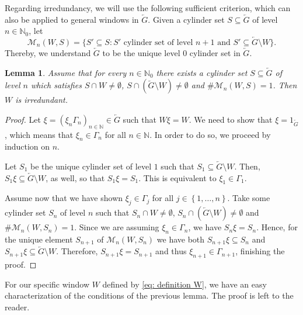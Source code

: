 \documentclass[titlepage,reqno,10pt]{amsart}
\newtheorem{lemma}[theorem]{Lemma}
\theoremstyle{definition}
\def\N{{\mathbb N}}
\newcommand{\set}[1]{\left\{ #1 \right\}}
\newcommand{\tm}{\subseteq}
\begin{document}
Regarding irredundancy, we will use the following sufficient criterion, which can also be applied to general windows in $\overleftarrow{G}$. Given a cylinder set $S\subseteq \overleftarrow{G}$ of level $n\in\N_0$, let 
$$ \mathcal{M}_n(W,S) =\{S'\tm S:S' \text{ cylinder set of level } n+1 \text{ and } S' \tm \overleftarrow{G}\setminus W\}.$$
Thereby, we understand $\overleftarrow{G}$ to be the unique level $0$ cylinder set in $\overleftarrow{G}$. 
\begin{lemma}\label{lem: suff. crit. irredundancy}
    Assume that for every $n\in\N_0$ there exists a cylinder set $S\tm \overleftarrow{G}$ of level $n$  which satisfies $S\cap W \neq \emptyset$, $S\cap (\overleftarrow{G}\setminus W)\neq \emptyset$ and $\# \mathcal{M}_n(W,S) = 1$.
    Then $W$ is irredundant.
\end{lemma}
\begin{proof}
    Let $\xi=(\xi_n\Gamma_n)_{n\in\mathbb{N}}\in \overleftarrow{G}$  such that $W\xi=W.$ We need to show that $\xi=1_{\overleftarrow{G}}$, which means that $\xi_n\in \Gamma_n$ for all $n\in\N$. In order to do so, we proceed by induction on $n$.
    
    Let $S_1$ be the unique cylinder set of level $1$ such that $S_1\tm \overleftarrow{G}\setminus W$.
    Then, $S_1\xi \tm \overleftarrow{G}\setminus W$, as well, so that $ S_1\xi = S_1$.
    This is equivalent to $\xi_1 \in \Gamma_1$.
    
    Assume now that we have shown $\xi_j \in \Gamma_j$ for all $j\in \set{1,\ldots, n}$.
    Take some cylinder set $S_n$ of level $n$ such that $S_n\cap W \neq \emptyset$, $S_n\cap (\overleftarrow{G}\setminus W)\neq \emptyset$ and $\# \mathcal{M}_n(W,S_n) =1$.
    Since we are assuming $\xi_n\in  \Gamma_n$, we have $ S_n\xi = S_n$.
    Hence, for the unique element $S_{n+1}$ of $\mathcal{M}_n(W,S_n)$ we have both $ S_{n+1}\xi\tm S_n$ and $S_{n+1}\xi \tm \overleftarrow{G}\setminus W$.
    Therefore, $S_{n+1}\xi = S_{n+1}$ and thus $\xi_{n+1} \in\Gamma_{n+1}$, finishing the proof.
\end{proof}
For our specific window $W$ defined by \eqref{eq: definition W}, we have an easy characterization of the conditions of the previous lemma.
The proof is left to the reader.
\end{document}
